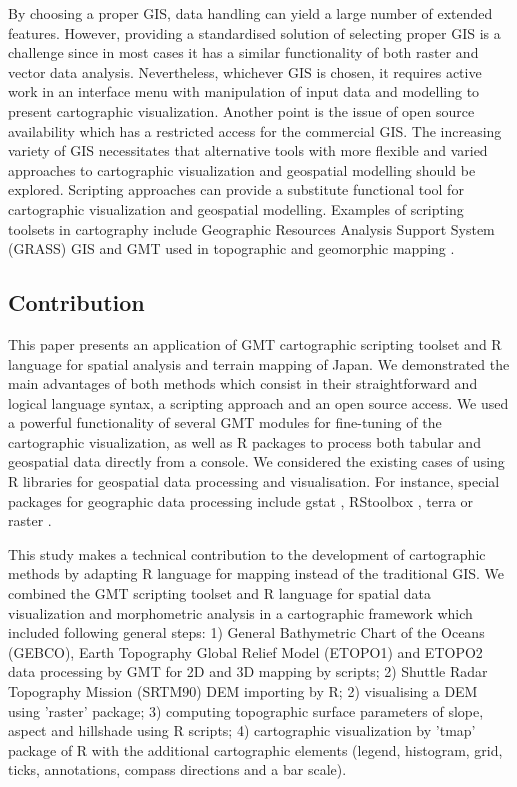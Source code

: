 \documentclass[land,article,submit,pdftex,moreauthors]{Definitions/mdpi}
\begin{document}
By choosing a proper GIS, data handling can yield a large number of extended features. However, providing a standardised solution of selecting proper GIS is a challenge since in most cases it has a similar functionality of both raster and vector data analysis. Nevertheless, whichever GIS is chosen, it requires active work in an interface menu with manipulation of input data and modelling to present cartographic visualization. Another point is the issue of open source availability which has a restricted access for the commercial GIS. The increasing variety of GIS necessitates that alternative tools with more flexible and varied approaches to cartographic visualization and geospatial modelling should be explored. Scripting approaches can provide a substitute functional tool for cartographic visualization and geospatial modelling. Examples of scripting toolsets in cartography include Geographic Resources Analysis Support System (GRASS) GIS \cite{Lemenkova202016,Lemenkova202026} and GMT used in topographic and geomorphic mapping \cite{ijgi11090473,geosciences12030140}. 

\subsection{Contribution}

This paper presents an application of GMT cartographic scripting toolset \cite{Wesseletal2019} and R language \cite{RCoreTeam} for spatial analysis and terrain mapping of Japan. We demonstrated the main advantages of both methods which consist in their straightforward and logical language syntax, a scripting approach and an open source access. We used a powerful functionality of several GMT modules for fine-tuning of the cartographic visualization, as well as R packages to process both tabular and geospatial data directly from a console. We considered the existing cases of using R libraries for geospatial data processing and visualisation. For instance, special packages for geographic data processing include gstat \cite{HENGL20081886}, RStoolbox \cite{app122412554}, terra or raster \cite{jimaging8120317}.

This study makes a technical contribution to the development of cartographic methods by adapting R language for mapping instead of the traditional GIS. We combined the GMT scripting toolset and R language for spatial data visualization and morphometric analysis in a cartographic framework which included following general steps: 1) General Bathymetric Chart of the Oceans (GEBCO), Earth Topography Global Relief Model (ETOPO1) and ETOPO2 data processing by GMT for 2D and 3D mapping by scripts; 2) Shuttle Radar Topography Mission (SRTM90) DEM importing by R; 2) visualising a DEM using 'raster' package; 3) computing topographic surface parameters of slope, aspect and hillshade using R scripts; 4) cartographic visualization by 'tmap' package of R with the additional cartographic elements (legend, histogram, grid, ticks, annotations, compass directions and a bar scale). 
\end{document}
